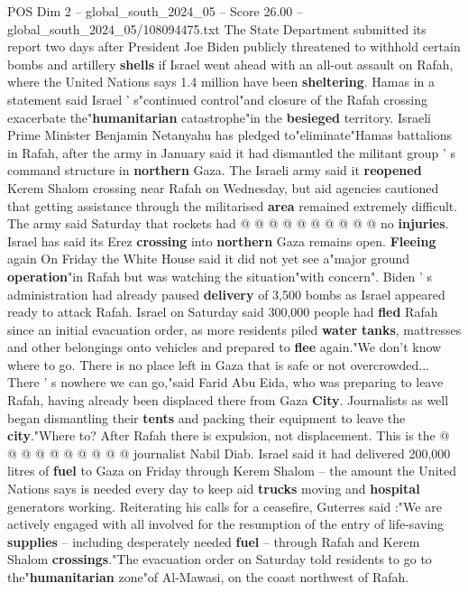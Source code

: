 \begin{textsample}{POS Dim 2 – global\_south\_2024\_05 – Score 26.00 – global\_south\_2024\_05/108094475.txt}
The State Department submitted its report two days after President Joe Biden publicly threatened to withhold certain bombs and artillery \textbf{shells} if Israel went ahead with an all-out assault on Rafah, where the United Nations says 1.4 million have been \textbf{sheltering}.
Hamas in a statement said Israel ' s"continued control"and closure of the Rafah crossing exacerbate the"\textbf{humanitarian} catastrophe"in the \textbf{besieged} territory.
Israeli Prime Minister Benjamin Netanyahu has pledged to"eliminate"Hamas battalions in Rafah, after the army in January said it had dismantled the militant group ' s command structure in \textbf{northern} Gaza.
The Israeli army said it \textbf{reopened} Kerem Shalom crossing near Rafah on Wednesday, but aid agencies cautioned that getting assistance through the militarised \textbf{area} remained extremely difficult.
The army said Saturday that rockets had @ @ @ @ @ @ @ @ @ @ no \textbf{injuries}.
Israel has said its Erez \textbf{crossing} into \textbf{northern} Gaza remains open. \textbf{Fleeing} again On Friday the White House said it did not yet see a"major ground \textbf{operation}"in Rafah but was watching the situation"with concern".
Biden ' s administration had already paused \textbf{delivery} of 3,500 bombs as Israel appeared ready to attack Rafah.
Israel on Saturday said 300,000 people had \textbf{fled} Rafah since an initial evacuation order, as more residents piled \textbf{water} \textbf{tanks}, mattresses and other belongings onto vehicles and prepared to \textbf{flee} again."We don't know where to go.
There is no place left in Gaza that is safe or not overcrowded...
There ' s nowhere we can go,"said Farid Abu Eida, who was preparing to leave Rafah, having already been displaced there from Gaza \textbf{City}.
Journalists as well began dismantling their \textbf{tents} and packing their equipment to leave the \textbf{city}."Where to?
After Rafah there is expulsion, not displacement.
This is the @ @ @ @ @ @ @ @ @ @ journalist Nabil Diab.
Israel said it had delivered 200,000 litres of \textbf{fuel} to Gaza on Friday through Kerem Shalom -- the amount the United Nations says is needed every day to keep aid \textbf{trucks} moving and \textbf{hospital} generators working.
Reiterating his calls for a ceasefire, Guterres said :"We are actively engaged with all involved for the resumption of the entry of life-saving \textbf{supplies} -- including desperately needed \textbf{fuel} -- through Rafah and Kerem Shalom \textbf{crossings}."The evacuation order on Saturday told residents to go to the"\textbf{humanitarian} zone"of Al-Mawasi, on the coast northwest of Rafah.

\end{textsample}
